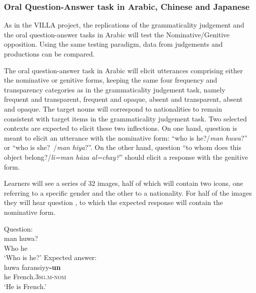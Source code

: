 \documentclass[output=paper,colorlinks,citecolor=brown,modfonts,nonflat]{../langscibook}
\begin{document}
\subsubsection{Oral Question-Answer task in Arabic, Chinese and Japanese}\label{sec:watorek:4.2.3}

\label{sec:watorek:4.2.3.1}

As in the VILLA project, the replications of the grammaticality judgement and the oral question-answer tasks in Arabic will test the Nominative/Genitive opposition. Using the same testing paradigm, data from judgements and productions can be compared.

The oral question-answer task in Arabic will elicit utterances comprising either the nominative or genitive forms, keeping the same four frequency and transparency categories as in the grammaticality judgement task, namely frequent and transparent, frequent and opaque, absent and transparent, absent and opaque. The target nouns will correspond to nationalities to remain consistent with target items in the grammaticality judgement task. Two selected contexts are expected to elicit these two inflections. On one hand, question  is meant to elicit an utterance with the nominative form: “who is he?\slash \textit{man huwa}?”  or “who is she?~/\textit{man hiya}?”. On the other hand, question  “to whom does this object belong?\slash \textit{li=man hāza al=chay?}” should elicit a response with the genitive form.

Learners will see a series of 32 images, half of which will contain two icons, one referring to a specific gender and the other to a nationality. For half of the images they will hear question   %
, to which the expected response will contain the nominative form.

\ea%
    \label{ex:watorek:18}
    \ea%
        \label{ex:watorek:18a}
        \ea
            Question: \\
            \gll    man huwa?\\
                    Who  he\\
            \glt    ‘Who is he?’
        \ex%
        \label{ex:watorek:18b}
            Expected answer:\\
            \gll     huwa faransiyy\textbf{{-un}}\\
                    he French\textsc{.3sg.m{-nom}}\\
            \glt    ‘He is French.’
        \z
        \ex \label{ex:watorek:18c}
        \ea%
\end{document}
